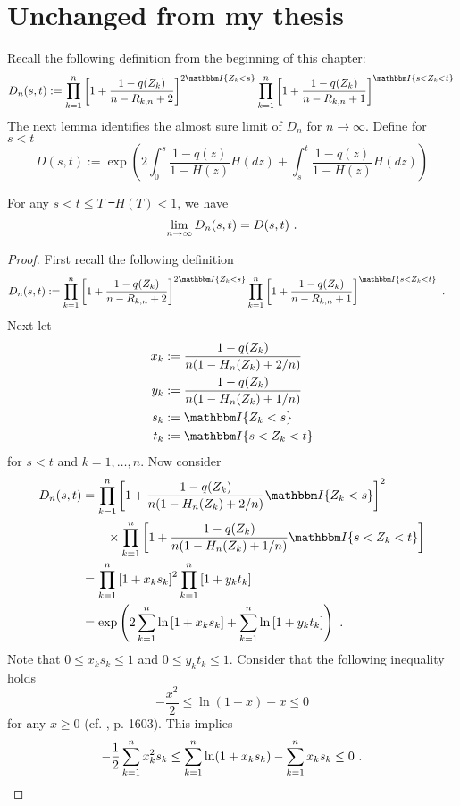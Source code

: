 \section{Unchanged from my thesis}
Recall the following  definition from the beginning of this chapter:
$$D_n(s,t) := \prod_{k=1}^{n} \left[1+\frac{1-q(Z_k)}{n-R_{k,n} +2}\right]^{2\I{Z_k<s}} \prod_{k=1}^{n}\left[1+\frac{1-q(Z_k)}{n-R_ {k,n}+1}\right]^{\I{s < Z_k < t}}\\$$
The next lemma identifies the almost sure limit of $D_n$ for $n\to\infty$. Define for $s<t$
$$D(s,t) := \exp\left(2\int_{0}^{s} \frac{1-q(z)}{1-H(z)} H(dz) + \int_{s}^{t} \frac{1-q(z)}{1-H(z)} H(dz)\right)$$
\begin{lemma} \label{lem:dn_limit}
	For any $s < t \leq T$ \st\ $H(T)<1$, we have
	$$\lim\limits_{n\to\infty}D_n(s,t) = D(s,t)\textrm{ .}$$
	\begin{proof}
		First recall the following definition
		\begin{align*}
		D_n(s,t) &:= \prod_{k=1}^{n} \left[1+\frac{1-q(Z_k)}{n-R_{k,n} +2}\right]^{2\I{Z_k<s}} \prod_{k=1}^{n}\left[1+\frac{1-q(Z_k)}{n-R_ {k,n}+1}\right]^{\I{s < Z_k < t}} \mdot
		\end{align*}
		Next let 
		\begin{align*}
		x_k &:= \frac{1-q(Z_k)}{n(1- H_n(Z_k) + 2/n)}\\
		y_k &:= \frac{1-q(Z_k)}{n(1- H_n(Z_k) + 1/n)}\\
		s_k &:= \I{Z_k < s} \\
		t_k &:= \I{s < Z_k < t}
		\end{align*}
		for $s<t$ and $k=1,\dots,n$.
		Now consider 
		\begin{align*}
		D_n(s,t) &= \prod_{k=1}^{n} \left[1+\frac{1-q(Z_k)}{n(1- H_n(Z_k) + 2/n)}\I{Z_k<s}\right]^{2}\\ 
		&\qquad \times \prod_{k=1}^{n}\left[1+\frac{1-q(Z_k)}{n(1-H_n(Z_k)+1/n)}\I{s < Z_k < t}\right]\\
		&= \prod_{k=1}^{n} \left[1+x_k s_k\right]^{2} \prod_{k=1}^{n}\left[1+y_k t_k\right]\\
		&= \exp\left(2\sum_{k=1}^{n}\ln\left[1+x_k s_k\right] + \sum_{k=1}^{n}\ln\left[1+y_k t_k\right]\right)\mdot
		\end{align*}
		Note that $0 \leq x_k s_k \leq 1$ and $0 \leq y_k t_k \leq 1$. Consider that the following inequality holds  
		$$-\frac{x^2}{2} \leq \ln(1+x) - x \leq 0$$ 
		for any $x \geq 0$ (cf.  \cite{stute1993strong}, p. 1603). This implies 
		$$-\frac{1}{2}\sum_{k=1}^{n}x_k^2 s_k \leq \sum_{k=1}^{n}\ln(1+x_k s_k) - \sum_{k=1}^{n}x_k s_k \leq 0\textrm{ .}$$ 

\end{proof}
\end{lemma}
